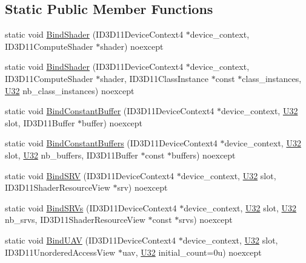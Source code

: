 \subsection*{Static Public Member Functions}
\begin{DoxyCompactItemize}
\item 
static void \hyperlink{structmage_1_1_pipeline_1_1_c_s_ac378ead24d5f1d9ccac5de7a72f44493}{Bind\+Shader} (I\+D3\+D11\+Device\+Context4 $\ast$device\+\_\+context, I\+D3\+D11\+Compute\+Shader $\ast$shader) noexcept
\item 
static void \hyperlink{structmage_1_1_pipeline_1_1_c_s_ae83ab12b384c493f6b9ff0efc6bdaeaa}{Bind\+Shader} (I\+D3\+D11\+Device\+Context4 $\ast$device\+\_\+context, I\+D3\+D11\+Compute\+Shader $\ast$shader, I\+D3\+D11\+Class\+Instance $\ast$const $\ast$class\+\_\+instances, \hyperlink{namespacemage_a41c104c036fba3756a74e19f793eeaa1}{U32} nb\+\_\+class\+\_\+instances) noexcept
\item 
static void \hyperlink{structmage_1_1_pipeline_1_1_c_s_ad8bb2fdda63ef3f3befe8a8354e591cc}{Bind\+Constant\+Buffer} (I\+D3\+D11\+Device\+Context4 $\ast$device\+\_\+context, \hyperlink{namespacemage_a41c104c036fba3756a74e19f793eeaa1}{U32} slot, I\+D3\+D11\+Buffer $\ast$buffer) noexcept
\item 
static void \hyperlink{structmage_1_1_pipeline_1_1_c_s_a956d3ae1575995d4a1cef95e51e8bd7f}{Bind\+Constant\+Buffers} (I\+D3\+D11\+Device\+Context4 $\ast$device\+\_\+context, \hyperlink{namespacemage_a41c104c036fba3756a74e19f793eeaa1}{U32} slot, \hyperlink{namespacemage_a41c104c036fba3756a74e19f793eeaa1}{U32} nb\+\_\+buffers, I\+D3\+D11\+Buffer $\ast$const $\ast$buffers) noexcept
\item 
static void \hyperlink{structmage_1_1_pipeline_1_1_c_s_a61b1b806374416a2d02aa686699467ec}{Bind\+S\+RV} (I\+D3\+D11\+Device\+Context4 $\ast$device\+\_\+context, \hyperlink{namespacemage_a41c104c036fba3756a74e19f793eeaa1}{U32} slot, I\+D3\+D11\+Shader\+Resource\+View $\ast$srv) noexcept
\item 
static void \hyperlink{structmage_1_1_pipeline_1_1_c_s_a74daa3036e4a4e46335bf745cff074c2}{Bind\+S\+R\+Vs} (I\+D3\+D11\+Device\+Context4 $\ast$device\+\_\+context, \hyperlink{namespacemage_a41c104c036fba3756a74e19f793eeaa1}{U32} slot, \hyperlink{namespacemage_a41c104c036fba3756a74e19f793eeaa1}{U32} nb\+\_\+srvs, I\+D3\+D11\+Shader\+Resource\+View $\ast$const $\ast$srvs) noexcept
\item 
static void \hyperlink{structmage_1_1_pipeline_1_1_c_s_a52e515eae0d6b43ad9bbcd9bfecd907c}{Bind\+U\+AV} (I\+D3\+D11\+Device\+Context4 $\ast$device\+\_\+context, \hyperlink{namespacemage_a41c104c036fba3756a74e19f793eeaa1}{U32} slot, I\+D3\+D11\+Unordered\+Access\+View $\ast$uav, \hyperlink{namespacemage_a41c104c036fba3756a74e19f793eeaa1}{U32} initial\+\_\+count=0u) noexcept

\end{DoxyCompactItemize}
